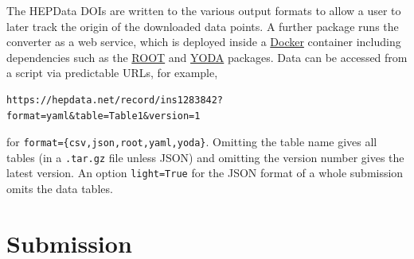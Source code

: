 \documentclass[a4paper]{jpconf}
\begin{document}
%
The HEPData DOIs are written to the various output formats to allow a user to later track the origin of the downloaded data points.  A further package runs the converter as a web service, which is deployed inside a \href{https://www.docker.com}{Docker} container including dependencies such as the \href{https://root.cern.ch}{ROOT} and \href{https://yoda.hepforge.org}{YODA} packages.  Data can be accessed from a script via predictable URLs, for example,
%
\begin{verbatim}
https://hepdata.net/record/ins1283842?format=yaml&table=Table1&version=1
\end{verbatim}
%
for \verb+format={csv,json,root,yaml,yoda}+.  Omitting the table name gives all tables (in a \texttt{.tar.gz} file unless JSON) and omitting the version number gives the latest version.  An option \texttt{light=True} for the JSON format of a whole submission omits the data tables.

\section{Submission}
\end{document}

